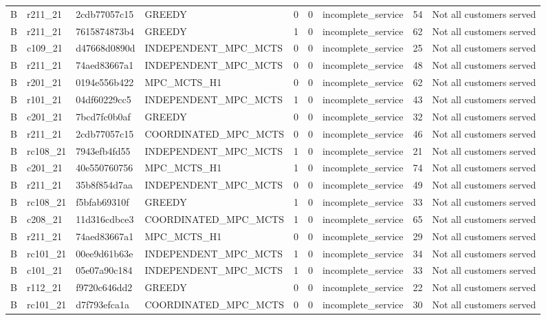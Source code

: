 \begin{table}
{\begin{tabular}{llllrrlrl}
B & r211\_21 & 2cdb77057c15 & GREEDY & 0 & 0 & incomplete\_service & 54 & Not all customers served \\
B & r211\_21 & 7615874873b4 & GREEDY & 1 & 0 & incomplete\_service & 62 & Not all customers served \\
B & c109\_21 & d47668d0890d & INDEPENDENT\_MPC\_MCTS & 0 & 0 & incomplete\_service & 25 & Not all customers served \\
B & r211\_21 & 74aed83667a1 & INDEPENDENT\_MPC\_MCTS & 0 & 0 & incomplete\_service & 48 & Not all customers served \\
B & r201\_21 & 0194e556b422 & MPC\_MCTS\_H1 & 0 & 0 & incomplete\_service & 62 & Not all customers served \\
B & r101\_21 & 04df60229cc5 & INDEPENDENT\_MPC\_MCTS & 1 & 0 & incomplete\_service & 43 & Not all customers served \\
B & c201\_21 & 7bcd7fc0b0af & GREEDY & 0 & 0 & incomplete\_service & 32 & Not all customers served \\
B & r211\_21 & 2cdb77057c15 & COORDINATED\_MPC\_MCTS & 0 & 0 & incomplete\_service & 46 & Not all customers served \\
B & rc108\_21 & 7943efb4fd55 & INDEPENDENT\_MPC\_MCTS & 1 & 0 & incomplete\_service & 21 & Not all customers served \\
B & c201\_21 & 40e550760756 & MPC\_MCTS\_H1 & 1 & 0 & incomplete\_service & 74 & Not all customers served \\
B & r211\_21 & 35b8f854d7aa & INDEPENDENT\_MPC\_MCTS & 0 & 0 & incomplete\_service & 49 & Not all customers served \\
B & rc108\_21 & f5bfab69310f & GREEDY & 1 & 0 & incomplete\_service & 33 & Not all customers served \\
B & c208\_21 & 11d316cdbce3 & COORDINATED\_MPC\_MCTS & 1 & 0 & incomplete\_service & 65 & Not all customers served \\
B & r211\_21 & 74aed83667a1 & MPC\_MCTS\_H1 & 0 & 0 & incomplete\_service & 29 & Not all customers served \\
B & rc101\_21 & 00ee9d61b63e & INDEPENDENT\_MPC\_MCTS & 1 & 0 & incomplete\_service & 34 & Not all customers served \\
B & c101\_21 & 05e07a90c184 & INDEPENDENT\_MPC\_MCTS & 1 & 0 & incomplete\_service & 33 & Not all customers served \\
B & r112\_21 & f9720c646dd2 & GREEDY & 0 & 0 & incomplete\_service & 22 & Not all customers served \\
B & rc101\_21 & d7f793efca1a & COORDINATED\_MPC\_MCTS & 0 & 0 & incomplete\_service & 30 & Not all customers served \\

\end{tabular}}
\end{table}
